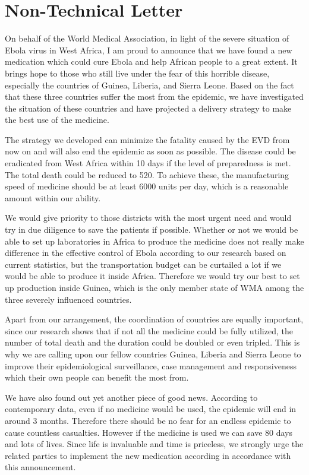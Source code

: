 \documentclass[12pt,a4paper,titlepage]{article}
\begin{document}
\newpage
\section{Non-Technical Letter}

On behalf of the World Medical Association, in light of the severe situation of Ebola virus in West Africa, I am proud to announce that we have found a new medication which could cure Ebola and help African people to a great extent. It brings hope to those who still live under the fear of this horrible disease, especially the countries of Guinea, Liberia, and Sierra Leone. Based on the fact that these three countries suffer the most from the epidemic, we have investigated the situation of these countries and have projected a delivery strategy to make the best use of the medicine.

The strategy we developed can minimize the fatality caused by the EVD from now on and will also end the epidemic as soon as possible. The disease could be eradicated from West Africa within 10 days if the level of preparedness is met. The total death could be reduced to 520. To achieve these, the manufacturing speed of medicine should be at least 6000 units per day, which is a reasonable amount within our ability. 

We would give priority to those districts with the most urgent need and would try in due diligence to save the patients if possible. Whether or not we would be able to set up laboratories in Africa to produce the medicine does not really make difference in the effective control of Ebola according to our research based on current statistics, but the transportation budget can be curtailed a lot if we would be able to produce it inside Africa. Therefore we would try our best to set up production inside Guinea, which is the only member state of WMA among the three severely influenced countries. 

Apart from our arrangement, the coordination of countries are equally important, since our research shows that if not all the medicine could be fully utilized, the number of total death and the duration could be doubled or even tripled. This is why we are calling upon our fellow countries Guinea, Liberia and Sierra Leone to improve their epidemiological surveillance, case management and responsiveness which their own people can benefit the most from.

We have also found out yet another piece of good news. According to contemporary data, even if no medicine would be used, the epidemic will end in around 3 months. Therefore there should be no fear for an endless epidemic to cause countless casualties. However if the medicine is used we can save 80 days and lots of lives. Since life is invaluable and time is priceless, we strongly urge the related parties to implement the new medication according in accordance with this announcement. 
\end{document}
